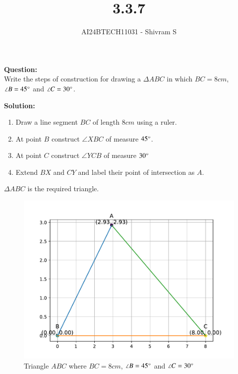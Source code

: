 \documentclass[journal]{IEEEtran}
\begin{document}

\vspace{3cm}

\title{3.3.7}
\author{AI24BTECH11031 - Shivram S
}
{\let\newpage\relax\maketitle}

\renewcommand{\thefigure}{\theenumi}
\renewcommand{\thetable}{\theenumi}
\setlength{\intextsep}{10pt} %


\renewcommand{\thetable}{\theenumi}


\textbf{Question: }\\
Write the steps of construction for drawing a $\Delta ABC$ in which $BC = 8cm$,
$\angle B = 45 \degree$ and $\angle C = 30 \degree$.

\textbf{Solution: } \\

\begin{enumerate}
    \item Draw a line segment $BC$ of length $8cm$ using a ruler.
    \item At point $B$ construct $\angle XBC$ of measure $45 \degree$.
    \item At point $C$ construct $\angle YCB$ of measure $30 \degree$
    \item Extend $BX$ and $CY$ and label their point of intersection as $A$.
\end{enumerate} 

$\Delta ABC$ is the required triangle.

\begin{figure}[h!]
    \centering
    \includegraphics[width=0.7\linewidth]{figs/fig.pdf}
    \caption{Triangle $ABC$ where $BC=8cm$, $\angle B = 45 \degree$ and $\angle C = 30 \degree$}
\end{figure}
\end{document}
